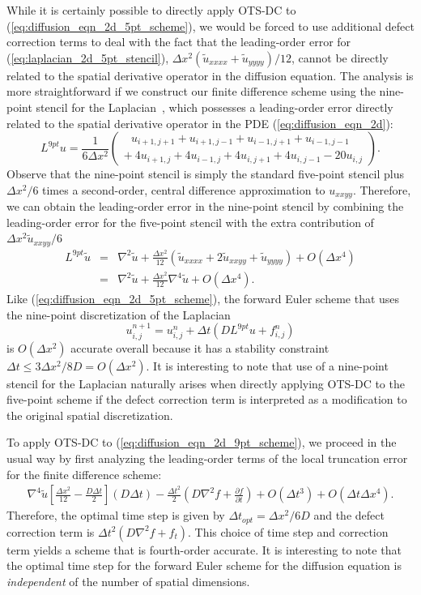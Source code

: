 \documentclass[fleqn,12pt,twoside]{article}
\newcommand{\beq}{\begin{equation}}
\newcommand{\eeq}{\end{equation}}
\newcommand{\bea}{\begin{eqnarray}}
\newcommand{\eea}{\end{eqnarray}}
\def\pt{\partial t}
\def\tu{\tilde{u}}
\def\dt{\Delta t}
\def\dx{\Delta x}
\def\dto{\dt_{opt}}
\begin{document}
While it is certainly possible to directly apply OTS-DC
to (\ref{eq:diffusion_eqn_2d_5pt_scheme}), we would be forced to use additional
defect correction terms to deal with the fact that the leading-order error for 
(\ref{eq:laplacian_2d_5pt_stencil}), 
$\dx^2 \left(\tu_{xxxx} + \tu_{yyyy}\right)/12$, cannot be directly related 
to the spatial derivative operator in the diffusion equation.  
The analysis is more straightforward if we construct our finite difference 
scheme using the nine-point stencil for the 
Laplacian~\cite{iserles_book,patra_2005}, which possesses a leading-order 
error directly related to the spatial derivative operator in the PDE 
(\ref{eq:diffusion_eqn_2d}):
\beq
  L^{9pt} u = \frac{1}{6 \dx^2} \left( 
      \begin{array}{l}
         \ \ \ u_{i+1,j+1} + u_{i+1,j-1}
            + u_{i-1,j+1} + u_{i-1,j-1} \\
         +\ 4 u_{i+1,j} + 4 u_{i-1,j}
           + 4 u_{i,j+1} + 4 u_{i,j-1}
           -20 u_{i,j} 
      \end{array}
    \right). 
  \label{eq:laplacian_2d_9pt_stencil}
\eeq
Observe that the nine-point stencil is simply the standard five-point 
stencil plus $\dx^2/6$ times a second-order, central difference 
approximation to $u_{xxyy}$.  Therefore, we can obtain the leading-order 
error in the nine-point stencil by combining the leading-order error for the 
five-point stencil with the extra contribution of 
$\dx^2 \tu_{xxyy}/6$
\bea
L^{9pt} \tu &=& \nabla^2 \tu 
              + \frac{\dx^2}{12} 
                \left(\tu_{xxxx} + 2 \tu_{xxyy} + \tu_{yyyy}\right)
              + O(\dx^4)
          \nonumber \\
          &=& \nabla^2 \tu + \frac{\dx^2}{12} \nabla^4 \tu + O(\dx^4).
  \label{eq:laplacian_2d_9pt_stencil_error}
\eea
Like (\ref{eq:diffusion_eqn_2d_5pt_scheme}), the forward Euler scheme that 
uses the nine-point discretization of the Laplacian 
\beq
  u^{n+1}_{i,j} = u^{n}_{i,j}
  + \dt \left( D L^{9pt} u + f_{i,j}^n \right)
  \label{eq:diffusion_eqn_2d_9pt_scheme}
\eeq
is $O(\dx^2)$ accurate overall because it has a stability constraint 
$\dt \le 3\dx^2/8D = O(\dx^2)$.
It is interesting to note that use of a nine-point stencil for the Laplacian 
naturally arises when directly applying OTS-DC to the five-point scheme if 
the defect correction term is interpreted as a modification to the original 
spatial discretization.

To apply OTS-DC to (\ref{eq:diffusion_eqn_2d_9pt_scheme}), we proceed in the 
usual way by first analyzing the leading-order terms of the local truncation
error for the finite difference scheme:
\bea
  \nabla^4 \tu
      \left[ \frac{\dx^2}{12} - \frac{D \dt}{2}  \right] (D \dt)
  - \frac{\dt^2}{2} \left( D\nabla^2 f + \frac{\partial f}{\pt} \right)
  + O(\dt^3) + O(\dt \dx^4).
  \label{eq:diffusion_eqn_2d_trunc_err}
\eea
Therefore, the optimal time step is given by $\dto = \dx^2/6D$ and the 
defect correction term is $\dt^2 \left( D\nabla^2 f + f_t \right)$.
This choice of time step and correction term yields a scheme that is 
fourth-order accurate.  It is interesting to note that the optimal time step
for the forward Euler scheme for the diffusion equation is \emph{independent} 
of the number of spatial dimensions.
\end{document}

